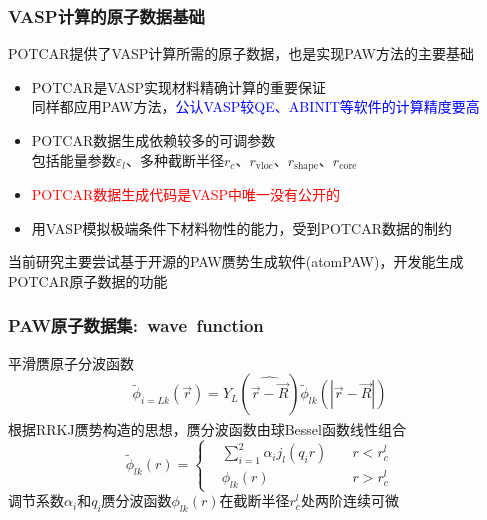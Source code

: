 \documentclass[cjk,slidestop,compress,mathserif,blue]{beamer}
\newcommand{\upcite}[1]{\hspace{0ex}\textsuperscript{\cite{#1}}} %
\begin{document}
\frame
{
	\frametitle{\textrm{VASP}计算的原子数据基础}
	\textrm{POTCAR}提供了\textrm{VASP}计算所需的原子数据，也是实现\textrm{PAW}方法的主要基础
	\begin{itemize}
		\item \textrm{POTCAR}是\textrm{VASP}实现材料精确计算的重要保证\\
			同样都应用\textrm{PAW}方法，\textcolor{blue}{公认\textrm{VASP}较\textrm{QE}、\textrm{ABINIT}等软件的计算精度要高}
		\item \textrm{POTCAR}数据生成依赖较多的可调参数\\
			包括能量参数$\varepsilon_l$、多种截断半径$r_c$、$r_{\mathrm{vloc}}$、$r_{\mathrm{shape}}$、$r_{\mathrm{core}}$
		\item \textcolor{red}{\textrm{POTCAR}数据生成代码是\textrm{VASP}中唯一没有公开的}
		\item 用\textrm{VASP}模拟极端条件下材料物性的能力，受到\textrm{POTCAR}数据的制约
	\end{itemize}

当前研究主要尝试基于开源的\textrm{PAW}赝势生成软件(\textrm{atomPAW})，开发能生成\textrm{POTCAR}原子数据的功能
}

\frame
{
	\frametitle{\textrm{PAW}原子数据集:~\textrm{wave~function}}
	平滑赝原子分波函数
	\begin{displaymath}
		\tilde\phi_{i=Lk}(\vec r)=Y_L(\widehat{\vec r-\vec R})\tilde\phi_{lk}(|\vec r-\vec R|)
	\end{displaymath}
	根据\textrm{RRKJ}赝势构造的思想，赝分波函数由球\textrm{Bessel}函数线性组合\upcite{JPCM6-8245_1994}
	\begin{displaymath}
		\tilde\phi_{lk}(r)=\left\{
		\begin{aligned}
			&\sum_{i=1}^2\alpha_ij_l(q_ir)\quad &r<r_c^l\\
			&\phi_{lk}(r)\quad&r>r_c^l
		\end{aligned}
		\right.
	\end{displaymath}
	调节系数$\alpha_i$和$q_i$赝分波函数$\phi_{lk}(r)$在截断半径$r_c^l$处两阶连续可微
}
\end{document}
